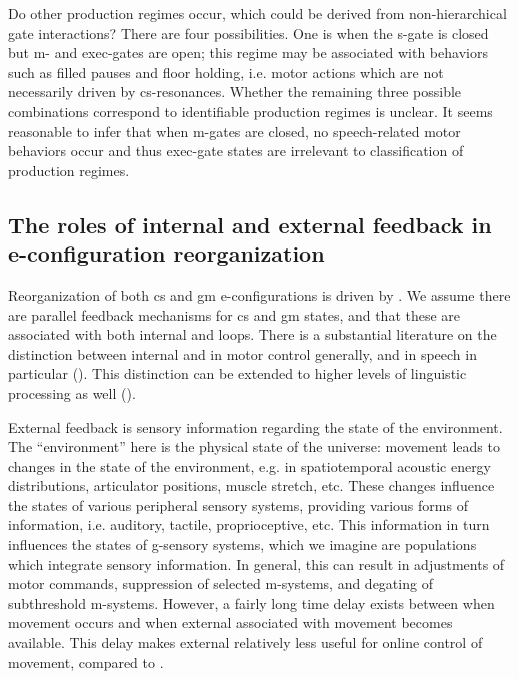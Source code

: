   Do other production regimes occur, which could  be derived from non-hierarchical gate interactions? There are four possibilities. One is when the s-gate is closed but m- and exec-gates are open; this regime may be associated with behaviors such as filled pauses and floor holding, i.e. motor actions which are not necessarily driven by cs-resonances. Whether the remaining three possible combinations correspond to identifiable production regimes is unclear. It seems reasonable to infer that when m-gates are closed, no speech-related motor behaviors occur and thus exec-gate states are irrelevant to classification of production regimes.

\subsection{The roles of internal and external feedback in e-configuration reorganization}

Reorganization of both cs and gm e-configurations is driven by . We assume there are parallel feedback mechanisms for cs and gm states, and that these are associated with both internal and  loops. There is a substantial literature on the distinction between internal and  in motor control generally, and in speech in particular (\citealt{Hickok2012,Kawato1999,MiallWolpert1996,RamanarayananEtAl2016,WolpertEtAl1995,WolpertKawato1998}). This distinction can be extended to higher levels of linguistic processing as well (\citealt{HagoortLevelt2009,Laver1973,Levelt1983,Levelt1989,Nooteboom1973,NooteboomQuené2008,Postma2000}).

  External feedback is sensory information regarding the state of the environment. The “environment” here is the physical state of the universe: movement leads to changes in the state of the environment, e.g. in spatiotemporal acoustic energy distributions, articulator positions, muscle stretch, etc. These changes influence the states of various peripheral sensory systems, providing various forms of information, i.e. auditory, tactile, proprioceptive, etc. This information in turn influences the states of g-sensory systems, which we imagine are populations which integrate sensory information. In general, this  can result in adjustments of motor commands, suppression of selected m-systems, and degating of subthreshold m-systems. However, a fairly long time delay exists between when movement occurs and when external  associated with movement becomes available. This delay makes external  relatively less useful for online control of movement, compared to . 

